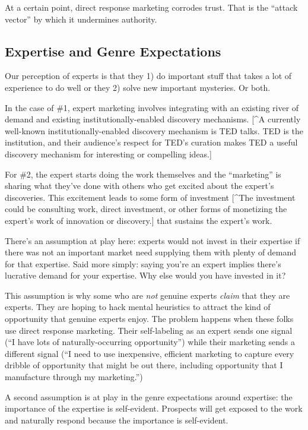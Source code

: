 \documentclass[13pt,]{tufte-handout}
\begin{document}
At a certain point, direct response marketing corrodes trust. That is
the ``attack vector'' by which it undermines authority.

\hypertarget{expertise-and-genre-expectations}{%
\subsection{Expertise and Genre
Expectations}\label{expertise-and-genre-expectations}}

Our perception of experts is that they 1) do important stuff that takes
a lot of experience to do well or they 2) solve new important mysteries.
Or both.

In the case of \#1, expert marketing involves integrating with an
existing river of demand and existing institutionally-enabled discovery
mechanisms. {[}\^{}A currently well-known institutionally-enabled
discovery mechanism is TED talks. TED is the institution, and their
audience's respect for TED's curation makes TED a useful discovery
mechanism for interesting or compelling ideas.{]}

For \#2, the expert starts doing the work themselves and the
``marketing'' is sharing what they've done with others who get excited
about the expert's discoveries. This excitement leads to some form of
investment {[}\^{}The investment could be consulting work, direct
investment, or other forms of monetizing the expert's work of innovation
or discovery.{]} that sustains the expert's work.

There's an assumption at play here: experts would not invest in their
expertise if there was not an important market need supplying them with
plenty of demand for that expertise. Said more simply: saying you're an
expert implies there's lucrative demand for your expertise. Why else
would you have invested in it?

This assumption is why some who are \emph{not} genuine experts
\emph{claim} that they are experts. They are hoping to hack mental
heuristics to attract the kind of opportunity that genuine experts
enjoy. The problem happens when these folks use direct response
marketing. Their self-labeling as an expert sends one signal (``I have
lots of naturally-occurring opportunity'') while their marketing sends a
different signal (``I need to use inexpensive, efficient marketing to
capture every dribble of opportunity that might be out there, including
opportunity that I manufacture through my marketing.'')

A second assumption is at play in the genre expectations around
expertise: the importance of the expertise is self-evident. Prospects
will get exposed to the work and naturally respond because the
importance is self-evident.
\end{document}
